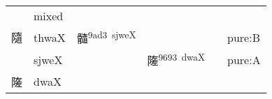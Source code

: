 \documentclass[14pt,a4paper]{scrartcl}
\begin{document}
\begin{longtable}[c]{@{}llllll@{}}
\begin{minipage}[t]{0.14\columnwidth}
\strut\end{minipage} &
\begin{minipage}[t]{0.14\columnwidth}\raggedright\strut
mixed
\strut\end{minipage}\tabularnewline
\begin{minipage}[t]{0.14\columnwidth}\raggedright\strut
隨
\strut\end{minipage} &
\begin{minipage}[t]{0.14\columnwidth}\raggedright\strut
thwaX
\strut\end{minipage} &
\begin{minipage}[t]{0.14\columnwidth}\raggedright\strut
髓\textsuperscript{9ad3~sjweX}
\strut\end{minipage} &
\begin{minipage}[t]{0.14\columnwidth}\raggedright\strut
\strut\end{minipage} &
\begin{minipage}[t]{0.14\columnwidth}\raggedright\strut
\strut\end{minipage} &
\begin{minipage}[t]{0.14\columnwidth}\raggedright\strut
pure:B
\strut\end{minipage}\tabularnewline
\begin{minipage}[t]{0.14\columnwidth}\raggedright\strut
𢀡
\strut\end{minipage} &
\begin{minipage}[t]{0.14\columnwidth}\raggedright\strut
sjweX
\strut\end{minipage} &
\begin{minipage}[t]{0.14\columnwidth}\raggedright\strut
\strut\end{minipage} &
\begin{minipage}[t]{0.14\columnwidth}\raggedright\strut
隓\textsuperscript{9693~dwaX}
\strut\end{minipage} &
\begin{minipage}[t]{0.14\columnwidth}\raggedright\strut
\strut\end{minipage} &
\begin{minipage}[t]{0.14\columnwidth}\raggedright\strut
pure:A
\strut\end{minipage}\tabularnewline
\begin{minipage}[t]{0.14\columnwidth}\raggedright\strut
隓
\strut\end{minipage} &
\begin{minipage}[t]{0.14\columnwidth}\raggedright\strut
dwaX
\strut\end{minipage} &
\begin{minipage}[t]{0.14\columnwidth}\raggedright\strut

\end{minipage}
\end{longtable}
\end{document}
